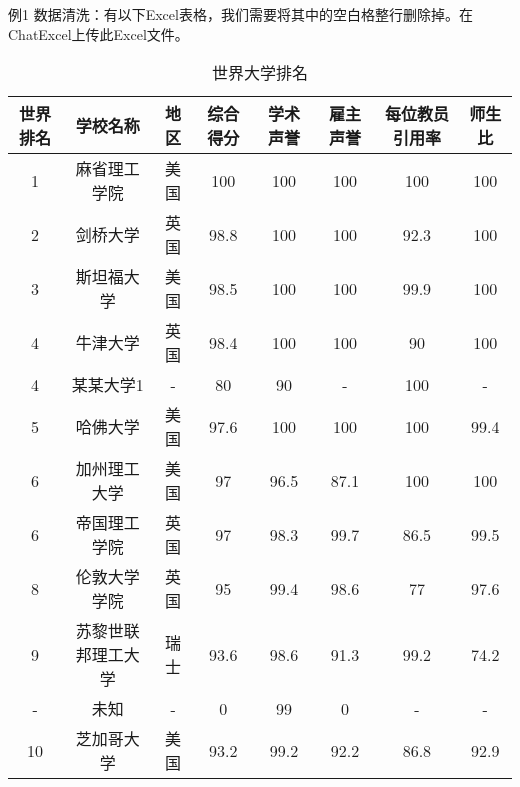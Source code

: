 例1 数据清洗：有以下Excel表格，我们需要将其中的空白格整行删除掉。在ChatExcel上传此Excel文件。
\begin{table}[h]
    \centering
    \begin{tabular}{cccccccc}
        \toprule
        世界排名 & 学校名称 & 地区 & 综合得分 & 学术声誉 & 雇主声誉 & 每位教员引用率 & 师生比 \\
        \midrule
        1  & 麻省理工学院     & 美国 & 100  & 100  & 100  & 100  & 100  \\
        2  & 剑桥大学         & 英国 & 98.8 & 100  & 100  & 92.3 & 100  \\
        3  & 斯坦福大学       & 美国 & 98.5 & 100  & 100  & 99.9 & 100  \\
        4  & 牛津大学         & 英国 & 98.4 & 100  & 100  & 90   & 100  \\
        4  & 某某大学1        & -    & 80   & 90   & -    & 100  & -    \\
        5  & 哈佛大学         & 美国 & 97.6 & 100  & 100  & 100  & 99.4 \\
        6  & 加州理工大学     & 美国 & 97   & 96.5 & 87.1 & 100  & 100  \\
        6  & 帝国理工学院     & 英国 & 97   & 98.3 & 99.7 & 86.5 & 99.5 \\
        8  & 伦敦大学学院     & 英国 & 95   & 99.4 & 98.6 & 77   & 97.6 \\
        9  & 苏黎世联邦理工大学 & 瑞士 & 93.6 & 98.6 & 91.3 & 99.2 & 74.2 \\
        -  & 未知             & -    & 0    & 99   & 0    & -    & -    \\
        10 & 芝加哥大学       & 美国 & 93.2 & 99.2 & 92.2 & 86.8 & 92.9 \\
        \bottomrule
    \end{tabular}
    \caption{世界大学排名}
    \label{tab:world_ranking}
\end{table}
\FloatBarrier





